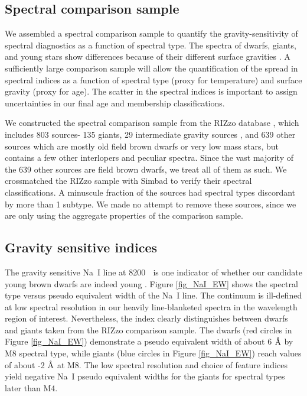 \subsection{Spectral comparison sample}
We assembled a spectral comparison sample to quantify the gravity-sensitivity of spectral diagnostics as a function of spectral type.  The spectra of dwarfs, giants, and young stars show differences because of their different surface gravities \citep{2012AJ....143..114S}.  A sufficiently large comparison sample will allow the quantification of the spread in spectral indices as a function of spectral type (proxy for temperature) and surface gravity (proxy for age).  The scatter in the spectral indices is important to assign uncertainties in our final age and membership classifications.

We constructed the spectral comparison sample from the RIZzo database \citep{cruz_kelle_2014_10721}, which includes 803 sources- 135 giants, 29 intermediate gravity sources \citep{2009AJ....137.3345C}, and 639 other sources which are mostly old field brown dwarfs or very low mass stars, but contains a few other interlopers and peculiar spectra.  Since the vast majority of the 639 other sources are field brown dwarfs, we treat all of them as such.  We crossmatched the RIZzo sample with Simbad to verify their spectral classifications.  A minuscule fraction of the sources had spectral types discordant by more than 1 subtype.  We made no attempt to remove these sources, since we are only using the aggregate properties of the comparison sample.

\subsection{Gravity sensitive indices}
The gravity sensitive Na~I line at 8200 \angstrom$\;$ is one indicator of whether our candidate young brown dwarfs are indeed young \citep{1999ApJ...525..466L,2007AJ....134.2398C,2009AJ....137.3345C}.  Figure \ref{fig_NaI_EW} shows the spectral type versus pseudo equivalent width of the Na~I line.  The continuum is ill-defined at low spectral resolution in our heavily line-blanketed spectra in the wavelength region of interest.  Nevertheless, the index clearly distinguishes between dwarfs and giants taken from the RIZzo comparison sample.  The dwarfs (red circles in Figure \ref{fig_NaI_EW}) demonstrate a pseudo equivalent width of about 6 $\mbox{\normalfont\AA}$ by M8 spectral type, while giants (blue circles in Figure \ref{fig_NaI_EW}) reach values of about -2 $\mbox{\normalfont\AA}$ at M8.  The low spectral resolution and choice of feature indices yield negative Na~I pseudo equivalent widths for the giants for spectral types later than M4.

